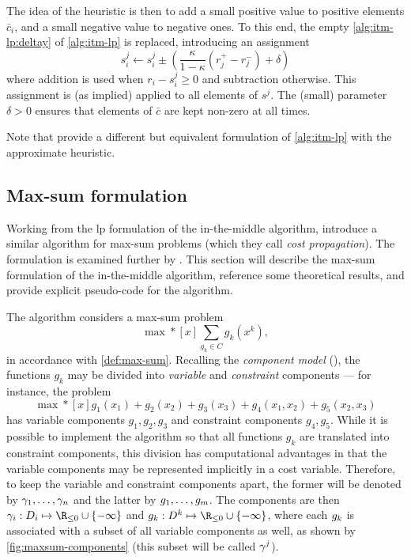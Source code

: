 The idea of the heuristic is then to add a small positive value to positive elements \(\bar{c}_i\), and a small negative value to negative ones.
To this end, the empty \cref{alg:itm-lp:deltay} of \cref{alg:itm-lp} is replaced, introducing an assignment
\begin{equation*}
	s^j_i \leftarrow s^j_i \pm \left(\frac{\kappa}{1-\kappa}(r^+_j - r^-_j) + \delta\right)
\end{equation*}
where addition is used when \(r_i - s^j_i \geq 0\) and subtraction otherwise.
This assignment is (as implied) applied to all elements of \(s^j\).
The (small) parameter \(\delta>0\) ensures that elements of \(\bar{c}\) are kept non-zero at all times.

Note that \textcite[\pno~97]{Bastert10} provide a different but equivalent formulation of \cref{alg:itm-lp} with the approximate heuristic.

\subsection{Max-sum formulation}
Working from the \gls{lp} formulation of the in-the-middle algorithm, \textcite{Wedelin08} introduce a similar algorithm for max-sum problems (which they call \emph{cost propagation}).
The formulation is examined further by \textcite[\pno~11\psqq]{Wedelin13}.
This section will describe the max-sum formulation of the in-the-middle algorithm, reference some theoretical results, and provide explicit pseudo-code for the algorithm.

The algorithm considers a max-sum problem
\begin{equation}\label{eq:maxsum}
	\max*[x] \sum_{g_k\in C} g_k(x^k),
\end{equation}
in accordance with \cref{def:max-sum}.
Recalling the \emph{component model} (), the functions \(g_k\) may be divided into \emph{variable} and \emph{constraint} components --- for instance, the problem
\begin{equation*}
	\max*[x] g_1(x_1) + g_2(x_2) + g_3(x_3) + g_4(x_1, x_2) + g_5(x_2, x_3)
\end{equation*}
has variable components \(g_1, g_2, g_3\) and constraint components \(g_4, g_5\).
While it is possible to implement the algorithm so that all functions \(g_k\) are translated into constraint components, this division has computational advantages in that the variable components may be represented implicitly in a cost variable.
Therefore, to keep the variable and constraint components apart, the former will be denoted by \(\gamma_1,\dotsc,\gamma_n\) and the latter by \(g_1,\dotsc,g_m\).
The components are then \(\vcomp_i : D_i \mapsto \Rminus \cup \{-\infty\}\) and \(\ccomp_k : D^k \mapsto \Rminus \cup \{-\infty\}\), where each \(g_k\) is associated with a subset of all variable components as well, as shown by \cref{fig:maxsum-components} (this subset will be called \(\gamma^j\)).

